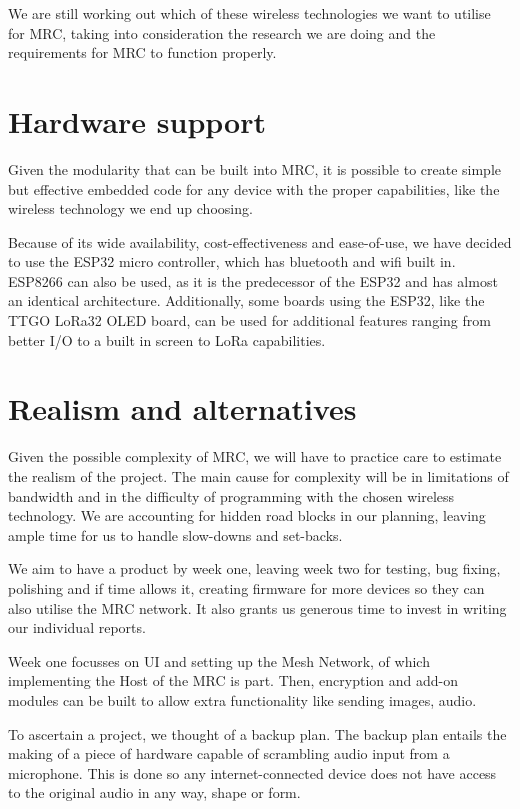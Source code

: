\documentclass{jatex-article}
\begin{document}
We are still working out which of these wireless technologies we want to
utilise for MRC, taking into consideration the research we are doing and the
requirements for MRC to function properly.

\section*{Hardware support}

Given the modularity that can be built into MRC, it is possible to create
simple but effective embedded code for any device with the proper capabilities,
like the wireless technology we end up choosing.

Because of its wide availability, cost-effectiveness and ease-of-use, we have
decided to use the ESP32 micro controller, which has bluetooth and wifi built
in. ESP8266 can also be used, as it is the predecessor of the ESP32 and has
almost an identical architecture. Additionally, some boards using the ESP32,
like the TTGO LoRa32 OLED board, can be used for additional features ranging
from better I/O to a built in screen to LoRa capabilities.

\section*{Realism and alternatives}

Given the possible complexity of MRC, we will have to practice care to estimate
the realism of the project. The main cause for complexity will be in
limitations of bandwidth and in the difficulty of programming with the chosen
wireless technology. We are accounting for hidden road blocks in our planning,
leaving ample time for us to handle slow-downs and set-backs.

We aim to have a product by week one, leaving week two for testing, bug fixing,
polishing and if time allows it, creating firmware for more devices so they can
also utilise the MRC network. It also grants us generous time to invest in
writing our individual reports.

Week one focusses on UI and setting up the Mesh Network, of which implementing
the Host of the MRC is part. Then, encryption and add-on modules can be built
to allow extra functionality like sending images, audio.

To ascertain a project, we thought of a backup plan. The backup plan entails
the making of a piece of hardware capable of scrambling audio input from a
microphone. This is done so any internet-connected device does not have access
to the original audio in any way, shape or form.
\end{document}
